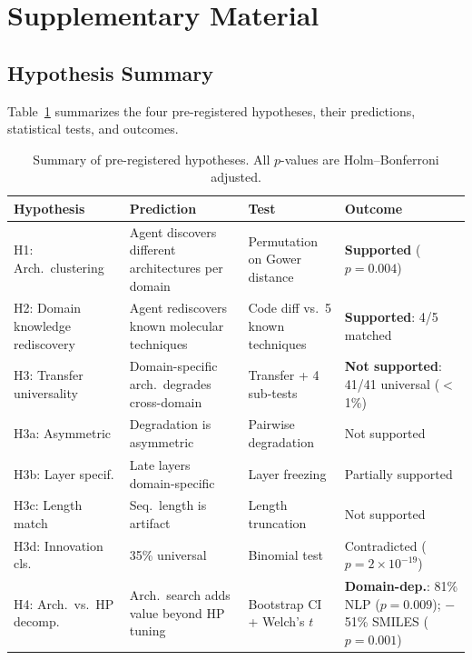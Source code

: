 \section{Supplementary Material}
\label{sec:supplementary}

\subsection{Hypothesis Summary}
\label{sec:hypothesis_summary}

Table~\ref{tab:hypotheses} summarizes the four pre-registered hypotheses, their predictions, statistical tests, and outcomes.

\begin{table}[h]
\caption{Summary of pre-registered hypotheses. All $p$-values are Holm--Bonferroni adjusted.}
\label{tab:hypotheses}
\centering
\scriptsize
\setlength{\tabcolsep}{4pt}
\begin{tabular}{@{}p{2.6cm}p{3.0cm}p{2.8cm}p{3.8cm}@{}}
\toprule
\textbf{Hypothesis} & \textbf{Prediction} & \textbf{Test} & \textbf{Outcome} \\
\midrule
H1: Arch.\ clustering & Agent discovers different architectures per domain & Permutation on Gower distance & \textbf{Supported} ($p = 0.004$) \\[3pt]
H2: Domain knowledge rediscovery & Agent rediscovers known molecular techniques & Code diff vs.\ 5 known techniques & \textbf{Supported}: 4/5 matched \\[3pt]
H3: Transfer universality & Domain-specific arch.\ degrades cross-domain & Transfer + 4 sub-tests & \textbf{Not supported}: 41/41 universal ($<$1\%) \\
\quad H3a: Asymmetric & Degradation is asymmetric & Pairwise degradation & Not supported \\
\quad H3b: Layer specif. & Late layers domain-specific & Layer freezing & Partially supported \\
\quad H3c: Length match & Seq.\ length is artifact & Length truncation & Not supported \\
\quad H3d: Innovation cls. & 35\% universal & Binomial test & Contradicted ($p\!=\!2\!\times\!10^{-19}$) \\[3pt]
H4: Arch.\ vs.\ HP decomp. & Arch.\ search adds value beyond HP tuning & Bootstrap CI + Welch's $t$ & \textbf{Domain-dep.}: 81\% NLP ($p\!=\!0.009$); $-$51\% SMILES ($p\!=\!0.001$) \\
\bottomrule
\end{tabular}
\end{table}

